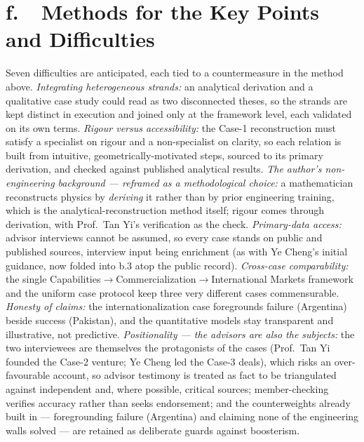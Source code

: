 \documentclass[11pt]{article}
\begin{document}
\section*{f.~~Methods for the Key Points and Difficulties}
Seven difficulties are anticipated, each tied to a countermeasure in the method above. \emph{Integrating heterogeneous strands:} an analytical derivation and a qualitative case study could read as two disconnected theses, so the strands are kept distinct in execution and joined only at the framework level, each validated on its own terms. \emph{Rigour versus accessibility:} the Case-1 reconstruction must satisfy a specialist on rigour and a non-specialist on clarity, so each relation is built from intuitive, geometrically-motivated steps, sourced to its primary derivation, and checked against published analytical results. \emph{The author's non-engineering background --- reframed as a methodological choice:} a mathematician reconstructs physics by \emph{deriving} it rather than by prior engineering training, which is the analytical-reconstruction method itself; rigour comes through derivation, with Prof.\ Tan Yi's verification as the check. \emph{Primary-data access:} advisor interviews cannot be assumed, so every case stands on public and published sources, interview input being enrichment (as with Ye Cheng's initial guidance, now folded into b.3 atop the public record). \emph{Cross-case comparability:} the single Capabilities$\rightarrow$Commercialization$\rightarrow$International Markets framework and the uniform case protocol keep three very different cases commensurable. \emph{Honesty of claims:} the internationalization case foregrounds failure (Argentina) beside success (Pakistan), and the quantitative models stay transparent and illustrative, not predictive. \emph{Positionality --- the advisors are also the subjects:} the two interviewees are themselves the protagonists of the cases (Prof.\ Tan Yi founded the Case-2 venture; Ye Cheng led the Case-3 deals), which risks an over-favourable account, so advisor testimony is treated as fact to be triangulated against independent and, where possible, critical sources; member-checking verifies accuracy rather than seeks endorsement; and the counterweights already built in --- foregrounding failure (Argentina) and claiming none of the engineering walls solved --- are retained as deliberate guards against boosterism.
\end{document}
